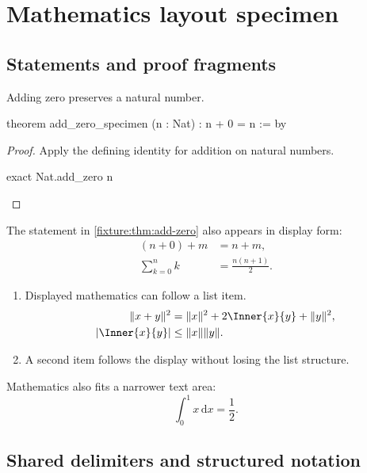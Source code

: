 \documentclass[11pt,oneside]{book}
\begin{document}
\chapter{Mathematics layout specimen}
\section{Statements and proof fragments}

\begin{theorem} \label{fixture:thm:add-zero}
  Adding zero preserves a natural number.
  \begin{lean}
    theorem add_zero_specimen (n : Nat) : n + 0 = n := by
  \end{lean}
\end{theorem}

\begin{proof}
  Apply the defining identity for addition on natural numbers.
  \begin{lean}
    exact Nat.add_zero n
  \end{lean}
\end{proof}

The statement in \cref{fixture:thm:add-zero} also appears in display form:
\begin{align}
  (n + 0) + m      & = n + m, \label{fixture:eq:sum} \\
  \sum_{k=0}^{n} k & = \frac{n(n+1)}{2}. \nonumber
\end{align}

\begin{enumerate}
  \item Displayed mathematics can follow a list item.
        \[
          \begin{aligned}
            \Norm{x+y}^{2}     & = \Norm{x}^{2} + 2\Inner{x}{y} + \Norm{y}^{2}, \\
            \Abs{\Inner{x}{y}} & \leq \Norm{x}\Norm{y}.
          \end{aligned}
        \]
  \item A second item follows the display without losing the list structure.
\end{enumerate}

\noindent
\begin{minipage}{0.65\linewidth}
  Mathematics also fits a narrower text area:
  \[
    \int_{0}^{1} x\,\mathrm{d}x = \frac{1}{2}.
  \]
\end{minipage}

\section{Shared delimiters and structured notation}
\end{document}
